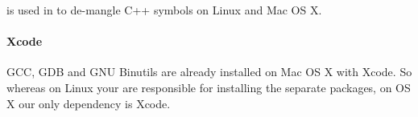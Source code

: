  is used in  to de-mangle C++ symbols on Linux and Mac OS X.

\paragraph{Xcode} GCC, GDB and GNU Binutils are already installed on Mac OS X with Xcode.  So whereas on Linux your are responsible for installing the separate packages, on OS X our only dependency is Xcode.
